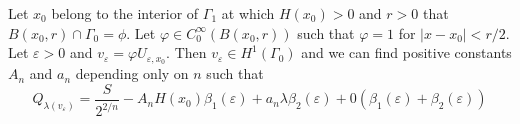 \begin{sketch of the proof}
\begin{itemize}
Let $x_{0}$ belong to the interior of $\Gamma_{1}$ at which $H(x_{0}) > 0 $ and $r > 0$ that $B(x_{0}, r) \cap \Gamma_{0} = \phi$. Let $\varphi \in C_{0}^{\infty}(B(x_{0}, r))$ such that $\varphi = 1$ for $|x-x_{0}| < r/2$. Let $\varepsilon > 0$ and $v_{\varepsilon}  = \varphi U_{\varepsilon, x_{0}}$. Then $v_{\varepsilon} \in H^{1}(\Gamma_{0})$ and we can find positive constants $A_{n}$ and $a_{n}$ depending only on $n$ such that      
\begin{equation}
Q_{\lambda(v_{\varepsilon})} = \dfrac{S}{2^{2/n}} -A_{n}H(x_{0})\beta_{1}(\varepsilon) + a_{n}\lambda \beta_{2}(\varepsilon) + 0(\beta_{1}(\varepsilon) + \beta_{2}(\varepsilon))\label{art2-eq10}
\end{equation}
\end{itemize}

\end{sketch of the proof}
